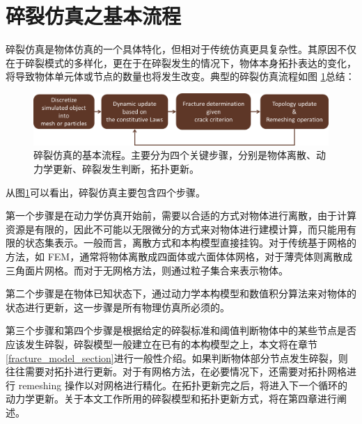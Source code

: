 \section{碎裂仿真之基本流程}
碎裂仿真是物体仿真的一个具体特化，但相对于传统仿真更具复杂性。其原因不仅在于碎裂模式的多样化，更在于在碎裂发生的情况下，物体本身拓扑表达的变化，将导致物体单元体或节点的数量也将发生改变。典型的碎裂仿真流程如图
\ref{fig_fracture_animation_pipeline}总结：
\begin{figure}[htbp!]
  \centering
  \captionsetup{justification=centering}
  \includegraphics[width=\linewidth]{chap/image/fracture_animation_pipeline}

  \caption{\label{fig_fracture_animation_pipeline}
           碎裂仿真的基本流程。主要分为四个关键步骤，分别是物体离散、动力学更新、碎裂发生判断，拓扑更新。
          }
\end{figure}

从图\ref{fig_fracture_animation_pipeline}可以看出，碎裂仿真主要包含四个步骤。

第一个步骤是在动力学仿真开始前，需要以合适的方式对物体进行离散，由于计算资源是有限的，因此不可能以无限微分的方式来对物体进行建模计算，而只能用有限的状态集表示。一般而言，离散方式和本构模型直接挂钩。对于传统基于网格的方法，如 FEM，通常将物体离散成四面体或六面体体网格，对于薄壳体则离散成三角面片网格。而对于无网格方法，则通过粒子集合来表示物体。

第二个步骤是在物体已知状态下，通过动力学本构模型和数值积分算法来对物体的状态进行更新，这一步骤是所有物理仿真所必须的。

第三个步骤和第四个步骤是根据给定的碎裂标准和阈值判断物体中的某些节点是否应该发生碎裂，碎裂模型一般建立在已有的本构模型之上，本文将在章节\ref{fracture_model_section}进行一般性介绍。如果判断物体部分节点发生碎裂，则往往需要对拓扑进行更新。对于有网格方法，在必要情况下，还需要对拓扑网格进行 remeshing 操作以对网格进行精化。在拓扑更新完之后，将进入下一个循环的动力学更新。关于本文工作所用的碎裂模型和拓扑更新方式，将在第四章进行阐述。

